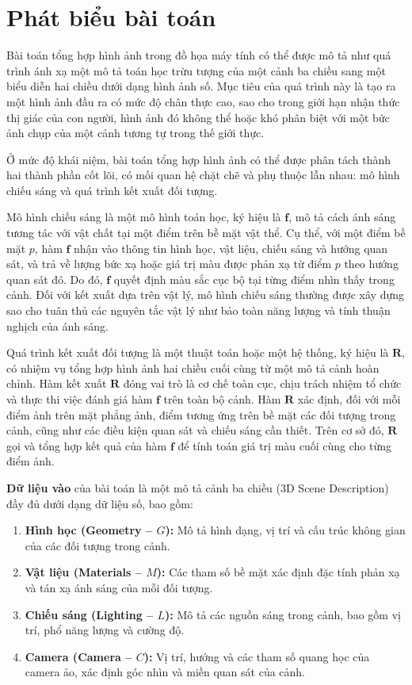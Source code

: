 \section{Phát biểu bài toán}

Bài toán tổng hợp hình ảnh trong đồ họa máy tính có thể được mô tả như quá trình ánh xạ một mô tả toán học trừu tượng của một cảnh ba chiều sang một biểu diễn hai chiều dưới dạng hình ảnh số. Mục tiêu của quá trình này là tạo ra một hình ảnh đầu ra có mức độ chân thực cao, sao cho trong giới hạn nhận thức thị giác của con người, hình ảnh đó không thể hoặc khó phân biệt với một bức ảnh chụp của một cảnh tương tự trong thế giới thực.

Ở mức độ khái niệm, bài toán tổng hợp hình ảnh có thể được phân tách thành hai thành phần cốt lõi, có mối quan hệ chặt chẽ và phụ thuộc lẫn nhau: mô hình chiếu sáng và quá trình kết xuất đối tượng.

Mô hình chiếu sáng là một mô hình toán học, ký hiệu là $\textbf{f}$, mô tả cách ánh sáng tương tác với vật chất tại một điểm trên bề mặt vật thể. Cụ thể, với một điểm bề mặt $p$, hàm $\textbf{f}$ nhận vào thông tin hình học, vật liệu, chiếu sáng và hướng quan sát, và trả về lượng bức xạ hoặc giá trị màu được phản xạ từ điểm $p$ theo hướng quan sát đó. Do đó, $\textbf{f}$ quyết định màu sắc cục bộ tại từng điểm nhìn thấy trong cảnh. Đối với kết xuất dựa trên vật lý, mô hình chiếu sáng thường được xây dựng sao cho tuân thủ các nguyên tắc vật lý như bảo toàn năng lượng và tính thuận nghịch của ánh sáng.

Quá trình kết xuất đối tượng là một thuật toán hoặc một hệ thống, ký hiệu là $\textbf{R}$, có nhiệm vụ tổng hợp hình ảnh hai chiều cuối cùng từ một mô tả cảnh hoàn chỉnh. Hàm kết xuất $\textbf{R}$ đóng vai trò là cơ chế toàn cục, chịu trách nhiệm tổ chức và thực thi việc đánh giá hàm $\textbf{f}$ trên toàn bộ cảnh. Hàm $\textbf{R}$ xác định, đối với mỗi điểm ảnh trên mặt phẳng ảnh, điểm tương ứng trên bề mặt các đối tượng trong cảnh, cũng như các điều kiện quan sát và chiếu sáng cần thiết. Trên cơ sở đó, $\textbf{R}$ gọi và tổng hợp kết quả của hàm $\textbf{f}$ để tính toán giá trị màu cuối cùng cho từng điểm ảnh.

\textbf{Dữ liệu vào} của bài toán là một mô tả cảnh ba chiều (3D Scene Description) đầy đủ dưới dạng dữ liệu số, bao gồm:
\begin{enumerate}
	\item \textbf{Hình học (Geometry -- $G$):} Mô tả hình dạng, vị trí và cấu trúc không gian của các đối tượng trong cảnh.
	\item \textbf{Vật liệu (Materials -- $M$):} Các tham số bề mặt xác định đặc tính phản xạ và tán xạ ánh sáng của mỗi đối tượng.
	\item \textbf{Chiếu sáng (Lighting -- $L$):} Mô tả các nguồn sáng trong cảnh, bao gồm vị trí, phổ năng lượng và cường độ.
	\item \textbf{Camera (Camera -- $C$):} Vị trí, hướng và các tham số quang học của camera ảo, xác định góc nhìn và miền quan sát của cảnh.
\end{enumerate}

